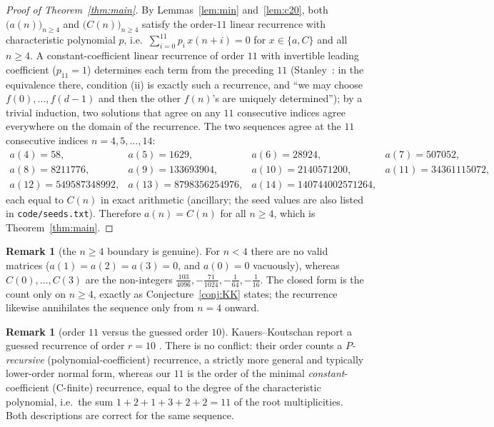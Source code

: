 \documentclass[11pt]{article}
\theoremstyle{definition}
\newtheorem{remark}[theorem]{Remark}
\begin{document}
\begin{proof}[Proof of Theorem~\ref{thm:main}]
By Lemmas~\ref{lem:min} and~\ref{lem:c20}, both $\bigl(a(n)\bigr)_{n\ge4}$ and
$\bigl(C(n)\bigr)_{n\ge4}$ satisfy the order-$11$ linear recurrence with characteristic
polynomial $p$, i.e.\ $\sum_{i=0}^{11}p_i\,x(n+i)=0$ for $x\in\{a,C\}$ and all $n\ge4$. A
constant-coefficient linear recurrence of order $11$ with invertible leading coefficient
($p_{11}=1$) determines each term from the preceding $11$ (Stanley~\cite[Thm.~4.1.1]{EC1}: in
the equivalence there, condition (ii) is exactly such a recurrence, and ``we may choose
$f(0),\dots,f(d-1)$ and then the other $f(n)$'s are uniquely determined''); by a trivial
induction, two solutions that agree on any $11$ consecutive indices agree everywhere on the
domain of the recurrence. The two sequences agree at the $11$ consecutive indices
$n=4,5,\dots,14$:
\[
\begin{array}{llll}
a(4)=58, & a(5)=1629, & a(6)=28924, & a(7)=507052,\\
a(8)=8211776, & a(9)=133693904, & a(10)=2140571200, & a(11)=34361115072,\\
a(12)=549587348992, & a(13)=8798356254976, & a(14)=140744002571264, &
\end{array}
\]
each equal to $C(n)$ in exact arithmetic (ancillary; the seed values are also listed in
\texttt{code/seeds.txt}). Therefore $a(n)=C(n)$ for all $n\ge4$, which is
Theorem~\ref{thm:main}. \qedhere
\end{proof}

\begin{remark}[the $n\ge4$ boundary is genuine]\label{rem:boundary}
For $n<4$ there are no valid matrices ($a(1)=a(2)=a(3)=0$, and $a(0)=0$ vacuously), whereas
$C(0),\dots,C(3)$ are the non-integers $\tfrac{103}{4096},-\tfrac{71}{1024},-\tfrac{1}{64},
-\tfrac{1}{16}$. The closed form is the count only on $n\ge4$, exactly as
Conjecture~\ref{conj:KK} states; the recurrence likewise annihilates the sequence only from
$n=4$ onward.
\end{remark}

\begin{remark}[order $11$ versus the guessed order $10$]\label{rem:order}
Kauers--Koutschan report a guessed recurrence of order $r=10$ \cite[Table~1]{KK23}. There is
no conflict: their order counts a \emph{$P$-recursive} (polynomial-coefficient) recurrence,
a strictly more general and typically lower-order normal form, whereas our $11$ is the order
of the minimal \emph{constant}-coefficient (C-finite) recurrence, equal to the degree of the
characteristic polynomial, i.e.\ the sum $1+2+1+3+2+2=11$ of the root multiplicities. Both
descriptions are correct for the same sequence.
\end{remark}
\end{document}

